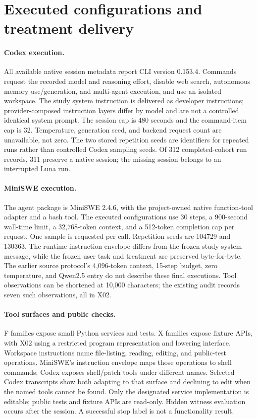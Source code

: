 \section{Executed configurations and treatment delivery}
\label{app:config}


\paragraph{Codex execution.}
All available native session metadata report CLI version 0.153.4. Commands request the recorded model and reasoning effort, disable web search, autonomous memory use/generation, and multi-agent execution, and use an isolated workspace. The study system instruction is delivered as developer instructions; provider-composed instruction layers differ by model and are not a controlled identical system prompt. The session cap is 480 seconds and the command-item cap is 32. Temperature, generation seed, and backend request count are unavailable, not zero. The two stored repetition seeds are identifiers for repeated runs rather than controlled Codex sampling seeds. Of 312 completed-cohort run records, 311 preserve a native session; the missing session belongs to an interrupted Luna run.

\paragraph{MiniSWE execution.}
The agent package is MiniSWE 2.4.6, with the project-owned native function-tool adapter and a bash tool. The executed configurations use 30 steps, a 900-second wall-time limit, a 32,768-token context, and a 512-token completion cap per request. One sample is requested per call. Repetition seeds are 104729 and 130363. The runtime instruction envelope differs from the frozen study system message, while the frozen user task and treatment are preserved byte-for-byte. The earlier source protocol's 4,096-token context, 15-step budget, zero temperature, and Qwen2.5 entry do not describe these final executions. Tool observations can be shortened at 10,000 characters; the existing audit records seven such observations, all in X02.

\paragraph{Tool surfaces and public checks.}
F families expose small Python services and tests. X families expose fixture APIs, with X02 using a restricted program representation and lowering interface. Workspace instructions name file-listing, reading, editing, and public-test operations. MiniSWE's instruction envelope maps those operations to shell commands; Codex exposes shell/patch tools under different names. Selected Codex transcripts show both adapting to that surface and declining to edit when the named tools cannot be found. Only the designated service implementation is editable; public tests and fixture APIs are read-only. Hidden witness evaluation occurs after the session. A successful stop label is not a functionality result.


